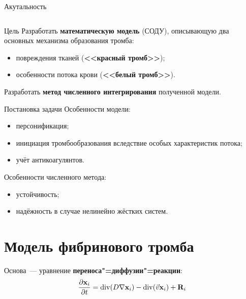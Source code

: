 \documentclass[
    14pt,
    xcolor=dvipsnames,
    aspectratio=169
]{beamer}
\begin{document}
\begin{frame}{Акутальность}
\begin{columns}[T]
\begin{column}{0.5\textwidth}
        \end{column}
    \end{columns}
\end{frame}

\begin{frame}{Цель}
    Разработать \textbf{математическую модель} (СОДУ), описывающую два основных механизма образования тромба:
    \begin{itemize}
        \item повреждения тканей (\textbf{<<красный тромб>>});
        \item особенности потока крови (\textbf{<<белый тромб>>}).
    \end{itemize}

    Разработать \textbf{метод численного интегрирования} полученной модели.
\end{frame}

\begin{frame}{Постановка задачи}
    Особенности модели:
    \begin{itemize}
        \item персонификация;
        \item инициация тромбообразования вследствие особых характеристик потока;
        \item учёт антикоагулянтов.
    \end{itemize}

    Особенности численного метода:
    \begin{itemize}
        \item устойчивость;
        \item надёжность в случае нелинейно жёстких систем.
    \end{itemize}
\end{frame}

\section{Модель фибринового тромба}

\begin{frame}{\secname}
    Основа~--- уравнение \textbf{переноса"=диффузии"=реакции}:
    \[
        \frac{\partial \mathbf{x}_i}{\partial t} = \mathrm{div} (D \nabla \mathbf{x}_i) - \mathrm{div} (\vec{v} \mathbf{x}_i) + \mathbf{R}_i
    \]
\end{frame}
\end{document}
